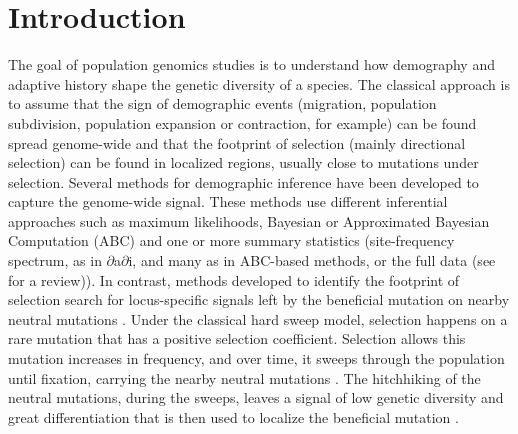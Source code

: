 \documentclass[a4paper, 12pt]{article}
\begin{document}
\section*{Introduction}
The goal of population genomics studies is to understand how demography and adaptive history shape the genetic diversity of a species. The classical approach is to assume that the sign of demographic events (migration, population subdivision, population expansion or contraction, for example) can be found spread genome-wide and that the footprint of selection (mainly directional selection) can be found in localized regions, usually close to mutations under selection. Several methods for demographic inference have been developed to capture the genome-wide signal. These methods use different inferential approaches such as maximum likelihoods, Bayesian or Approximated Bayesian Computation (ABC) and one or more summary statistics (site-frequency spectrum, as in $\partial$a$\partial$i, and many as in ABC-based methods, or the full data (see \cite{Beichman:2018bx} for a review)). In contrast, methods developed to identify the footprint of selection search for locus-specific signals left by the beneficial mutation on nearby neutral mutations \citep{Tajima:1989un, Fay:2000dl, Kim:2004ih}. Under the classical hard sweep model, selection happens on a rare mutation that has a positive selection coefficient. Selection allows this mutation increases in frequency, and over time, it sweeps through the population until fixation, carrying the nearby neutral mutations \citep{Smith:1974cy,Kaplan:1989tm, Barton:2000fg}. The hitchhiking of the neutral mutations, during the sweeps, leaves a signal of low genetic diversity and great differentiation that is then used to localize the beneficial mutation \citep{Nielsen:2005kx, Pool:2010eh, Scheinfeldt:2013iz, Vitti:2013jp, Casillas:2017jv}.
\end{document}

